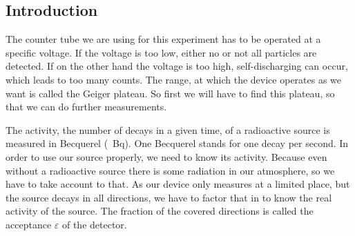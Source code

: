 \subsection{Introduction}

The counter tube we are using for this experiment has to be operated at a specific voltage.
If the voltage is too low, either no or not all particles are detected.
If on the other hand the voltage is too high, self-discharging can occur, which leads to too many counts.
The range, at which the device operates as we want is called the Geiger plateau.
So first we will have to find this plateau, so that we can do further measurements.

The activity, the number of decays in a given time, of a radioactive source is measured in Becquerel (\SI{}{\becquerel}).
One Becquerel stands for one decay per second. 
In order to use our source properly, we need to know its activity.
Because even without a radioactive source there is some radiation in our atmosphere, so we have to take account to that.
As our device only measures at a limited place, but the source decays in all directions, we have to factor that in to know the real activity of the source.
The fraction of the covered directions is called the acceptance $\varepsilon$ of the detector.
